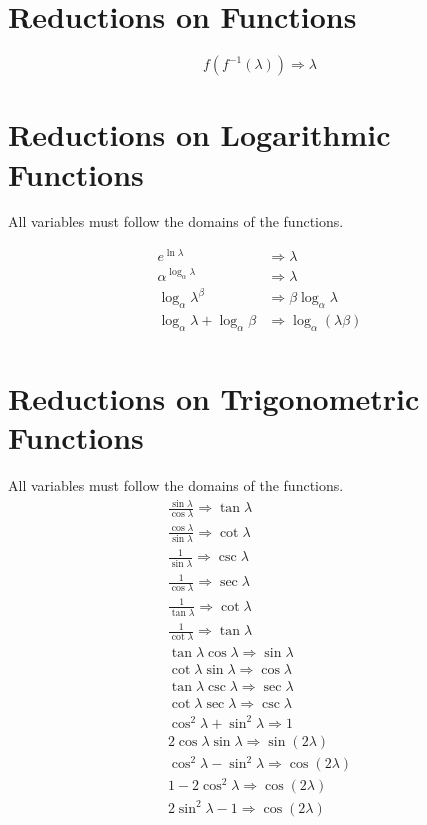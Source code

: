\documentclass[11pt,a4paper]{book}
\begin{document}
\section{Reductions on Functions}

\begin{equation}
f(f^{-1}(\lambda)) \Rightarrow \lambda
\end{equation}

\section{Reductions on Logarithmic Functions}

All variables must follow the domains of the functions.

\begin{align}
e^{\ln\lambda} &\Rightarrow \lambda\\
\alpha^{\log_\alpha\lambda} &\Rightarrow \lambda \\
\log_{\alpha}\lambda^\beta &\Rightarrow \beta \log_\alpha \lambda \\
\log_{\alpha}\lambda + \log_\alpha\beta &\Rightarrow \log_{\alpha} (\lambda\beta) \\
\end{align}

\section{Reductions on Trigonometric Functions}
All variables must follow the domains of the functions.
\begin{eqnarray}
\frac{\sin\lambda}{\cos \lambda} \Rightarrow \tan \lambda \\
\frac{\cos \lambda}{\sin \lambda} \Rightarrow \cot \lambda \\
\frac{1}{\sin \lambda} \Rightarrow \csc\lambda \\
\frac{1}{\cos \lambda} \Rightarrow \sec\lambda \\
\frac{1}{\tan\lambda} \Rightarrow \cot \lambda \\
\frac{1}{\cot \lambda} \Rightarrow \tan \lambda \\
\tan \lambda \cos\lambda \Rightarrow \sin \lambda \\
\cot \lambda \sin \lambda \Rightarrow \cos \lambda \\
\tan \lambda \csc \lambda \Rightarrow \sec \lambda \\
\cot \lambda \sec \lambda \Rightarrow \csc \lambda \\
\cos^2 \lambda + \sin^2 \lambda \Rightarrow 1 \\
2 \cos \lambda \sin \lambda \Rightarrow \sin \left(2 \lambda\right) \\
\cos^2 \lambda - \sin^2 \lambda \Rightarrow \cos \left(2 \lambda \right) \\
1 - 2\cos^2\lambda \Rightarrow \cos \left(2 \lambda \right) \\
2\sin^2\lambda - 1 \Rightarrow \cos \left(2 \lambda \right)
\end{eqnarray}
\end{document}
